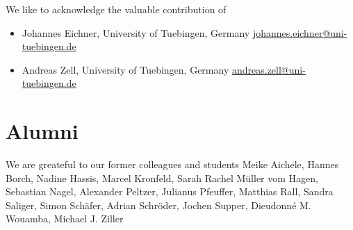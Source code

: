 We like to acknowledge the valuable contribution of
\begin{itemize}
\item Johannes Eichner,
  University of Tuebingen, Germany
  \href{mailto:johannes.eichner@uni-tuebingen.de}{johannes.eichner@uni-tuebingen.de}
\item Andreas Zell, 
  University of Tuebingen, Germany
  \href{mailto:andreas.zell@uni-tuebingen.de}{andreas.zell@uni-tuebingen.de}
\end{itemize}

\section{Alumni}

We are greateful to our former colleagues and students
Meike Aichele,
Hannes Borch,
Nadine Hassis,
Marcel Kronfeld,
Sarah Rachel M\"uller vom Hagen,
Sebastian Nagel,
Alexander Peltzer,
Julianus Pfeuffer,
Matthias Rall,
Sandra Saliger,
Simon Sch\"afer,
Adrian Schr\"oder,
Jochen Supper,
Dieudonn\'e M. Wouamba,
Michael J. Ziller